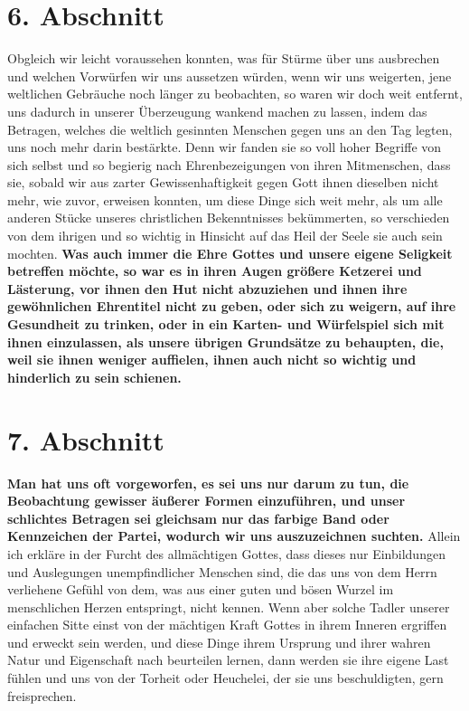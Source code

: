 \section{6. Abschnitt} \label{kap9_ab6}

Obgleich wir leicht voraussehen konnten, was für Stürme über uns ausbrechen und
welchen Vorwürfen wir uns aussetzen würden, wenn wir uns weigerten, jene
weltlichen Gebräuche noch länger zu beobachten, so waren wir doch weit entfernt,
uns dadurch in unserer Überzeugung wankend machen zu lassen, indem das
Betragen, welches die weltlich gesinnten Menschen gegen uns an den Tag legten,
uns noch mehr darin bestärkte. Denn wir fanden sie so voll hoher Begriffe von
sich selbst und so begierig nach Ehrenbezeigungen von ihren Mitmenschen, dass
sie, sobald wir aus zarter Gewissenhaftigkeit gegen Gott ihnen dieselben nicht
mehr, wie zuvor, erweisen konnten, um diese Dinge sich weit mehr, als um alle
anderen Stücke unseres christlichen Bekenntnisses bekümmerten, so verschieden
von
dem ihrigen und so wichtig in Hinsicht auf das Heil der Seele sie auch sein
mochten. \label{ref:09_06_grundsaetze}
\textbf{Was auch immer die Ehre Gottes und unsere eigene Seligkeit
betreffen möchte, so war es in ihren Augen größere
Ketzerei und Lästerung,
vor ihnen den
Hut nicht abzuziehen und ihnen ihre gewöhnlichen Ehrentitel nicht zu geben, oder
sich zu weigern, auf ihre Gesundheit zu trinken, oder in
ein Karten- und
Würfelspiel sich mit ihnen einzulassen, als
unsere übrigen Grundsätze zu
behaupten, die, weil sie ihnen weniger auffielen, ihnen auch nicht so wichtig
und hinderlich zu sein schienen.}

\section{7. Abschnitt} \label{kap9_ab7}

\label{ref:09_07_vorwurff} \textbf{Man hat uns oft vorgeworfen, es sei
uns nur darum zu tun, die Beobachtung
gewisser äußerer Formen einzuführen, und unser schlichtes Betragen sei gleichsam
nur das farbige Band oder Kennzeichen der Partei, wodurch wir uns auszuzeichnen
suchten.} Allein ich erkläre in der Furcht des allmächtigen Gottes, dass dieses
nur Einbildungen und Auslegungen unempfindlicher Menschen sind, die das uns von
dem Herrn verliehene Gefühl von dem, was aus einer guten und bösen Wurzel im
menschlichen Herzen entspringt, nicht kennen. Wenn aber solche Tadler unserer
einfachen Sitte einst von der mächtigen Kraft Gottes in ihrem Inneren ergriffen
und erweckt sein werden, und diese Dinge ihrem Ursprung und ihrer wahren Natur
und Eigenschaft nach beurteilen lernen, dann werden sie ihre eigene Last fühlen
und uns von der Torheit oder Heuchelei, der sie uns
beschuldigten, gern freisprechen.

